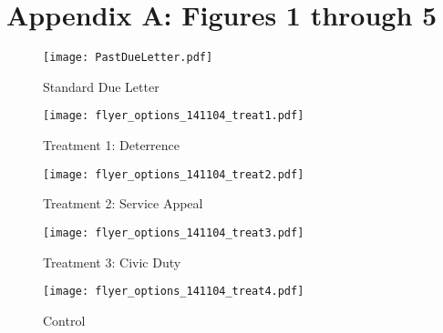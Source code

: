 \documentclass[12pt,titlepage]{article}
\begin{document}
\bigskip

\bigskip

\section*{Appendix A: Figures 1 through 5}
 \newpage
 
\begin{figure}[htpb]
\begin{center}
\caption{Standard Due Letter}
\bigskip
\texttt{[image: PastDueLetter.pdf]}
\end{center}
\end{figure}
\newpage
\begin{figure}[htpb]
\begin{center}
\caption{Treatment 1: Deterrence}
\bigskip
\texttt{[image: flyer\_options\_141104\_treat1.pdf]}
\end{center}
\end{figure}
\newpage
\begin{figure}[htpb]
\begin{center}
\caption{Treatment 2: Service Appeal}
\bigskip
\texttt{[image: flyer\_options\_141104\_treat2.pdf]}
\end{center}
\end{figure}
\newpage
\begin{figure}[htpb]
\begin{center}
\caption{Treatment 3: Civic Duty}
\bigskip
\texttt{[image: flyer\_options\_141104\_treat3.pdf]}
\end{center}
\end{figure}
\newpage
\begin{figure}[htpb]
\begin{center}
\caption{Control}
\bigskip
\texttt{[image: flyer\_options\_141104\_treat4.pdf]}
\end{center}
\end{figure}
\end{document}
